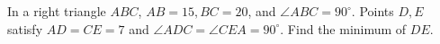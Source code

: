 In a right triangle $ABC$, $AB=15,BC=20$, and $\angle ABC=90^\circ$. Points $D,E$ satisfy $AD=CE=7$ and $\angle ADC=\angle CEA=90^\circ$. Find the minimum of $DE$.
